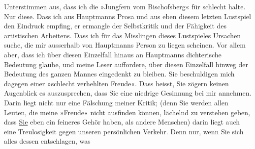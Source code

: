 \begin{ledgroupsized}[t]{13cm}
               Unterstimmen aus, dass ich die »Jungfern vom
                  Bischofsberg« für schlecht halte. Nur diese. Dass ich aus Hauptmanns Prosa und aus eben diesem letzten Lustspiel den Eindruck empfing, er ermangle
               der Selbstkritik und der Fähigkeit des artistischen Arbeitens. Dass ich für das
               Misslingen dieses Lustspieles
               Ursachen suche, die mir ausserhalb von Hauptmanns Person zu liegen scheinen. Vor allem aber, dass ich über diesen
               Einzelfall hinaus an Hauptmanns dichterische
               Bedeutung glaube, und meine Leser auffordere, über diesen Einzelfall hinweg der
               Bedeutung des ganzen Mannes
               eingedenkt zu bleiben.\pend
           \pstart
           Sie beschuldigen mich dagegen einer »schlecht verhehlten Freude«. Dass heisst, Sie
               zögern keinen Augenblick es auszu{\pb}sprechen, dass Sie eine
               niedrige Gesinnung bei mir annehmen. Darin liegt nicht nur eine Fälschung meiner
               Kritik; (denn Sie werden allen Leuten, die meine »Freude« nicht ausfinden können,
               lächelnd zu verstehen geben, dass \uline{Sie} eben ein
               feineres Gehör haben, als andere Menschen) darin liegt auch eine Treulosigkeit gegen
               unseren persönlichen Verkehr. Denn nur, wenn Sie sich alles dessen entschlagen, was

\end{ledgroupsized}
